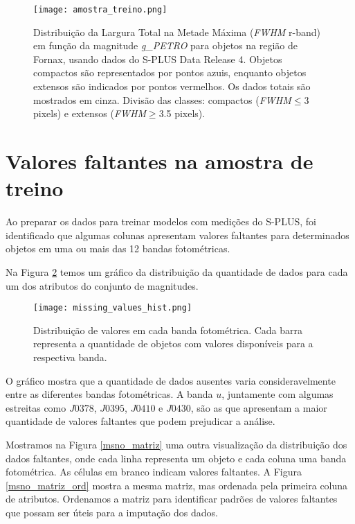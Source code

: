 \begin{figure}[!ht]
    \centering
    \texttt{[image: amostra\_treino.png]}
    \caption[]{Distribuição da Largura Total na Metade Máxima (\textit{FWHM} r-band) em função da magnitude \textit{g\_PETRO} para objetos na região de Fornax, usando dados do S-PLUS Data Release 4. Objetos compactos são representados por pontos azuis, enquanto objetos extensos são indicados por pontos vermelhos. Os dados totais são mostrados em cinza. Divisão das classes: compactos (\textit{FWHM}$\leq$3 pixels) e extensos (\textit{FWHM}$\geq$3.5 pixels).}
    \label{amostra_treino}
\end{figure}

\vspace{\baselineskip}

\section{Valores faltantes na amostra de treino}
Ao preparar os dados para treinar modelos com medições do S-PLUS, foi identificado que algumas colunas apresentam valores faltantes para determinados objetos em uma ou mais das 12 bandas fotométricas. 

Na Figura \ref{missing_values_hist} temos um gráfico da distribuição da quantidade de dados para cada um dos atributos do conjunto de magnitudes.

\begin{figure}[!ht]
    \begin{center}
    \texttt{[image: missing\_values\_hist.png]}
    \caption[]{Distribuição de valores em cada banda fotométrica. Cada barra representa a quantidade de objetos com valores disponíveis para a respectiva banda.}
    \label{missing_values_hist}
    \end{center}
\end{figure}

\vspace{\baselineskip}

O gráfico mostra que a quantidade de dados ausentes varia consideravelmente entre as diferentes bandas fotométricas. A banda $u$, juntamente com algumas estreitas como $J0378$, $J0395$, $J0410$ e $J0430$, são as que apresentam a maior quantidade de valores faltantes que podem prejudicar a análise.

\vspace{\baselineskip}

Mostramos na Figura \ref{msno_matriz} uma outra visualização da distribuição dos dados faltantes, onde cada linha representa um objeto e cada coluna uma banda fotométrica. As células em branco indicam valores faltantes. A Figura \ref{msno_matriz_ord} mostra a mesma matriz, mas ordenada pela primeira coluna de atributos. Ordenamos a matriz para identificar padrões de valores faltantes que possam ser úteis para a imputação dos dados.

